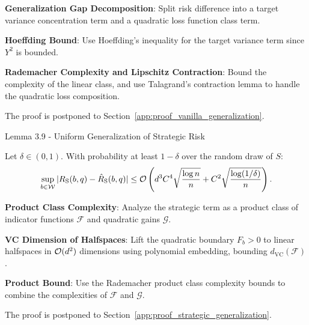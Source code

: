 \begin{guideblock}
\item \textbf{Generalization Gap Decomposition}: Split risk difference into a target variance concentration term and a quadratic loss function class term.
\item \textbf{Hoeffding Bound}: Use Hoeffding's inequality for the target variance term since $Y^2$ is bounded.
\item \textbf{Rademacher Complexity and Lipschitz Contraction}: Bound the complexity of the linear class, and use Talagrand's contraction lemma to handle the quadratic loss composition.
\end{guideblock}
The proof is postponed to Section~\ref{app:proof_vanilla_generalization}.

\begin{sourceblock}{Lemma 3.9 - Uniform Generalization of Strategic Risk}
\begin{lemma}
\label{lem:strategic_generalization}
Let $\delta \in (0, 1)$. With probability at least $1 - \delta$ over the random draw of $S$:
\begin{equation}
    \label{eq:strategic_gen_bound}
    \sup_{b \in \mathcal{W}} |R_{\mathrm{S}}(b, q) - \hat{R}_{\mathrm{S}}(b, q)| \le \mathcal{O}\left( d^3 C^4 \sqrt{\frac{\log n}{n}} + C^2 \sqrt{\frac{\log(1/\delta)}{n}} \right).
\end{equation}
\end{lemma}
\end{sourceblock}

\begin{guideblock}
\item \textbf{Product Class Complexity}: Analyze the strategic term as a product class of indicator functions $\mathcal{F}$ and quadratic gains $\mathcal{G}$.
\item \textbf{VC Dimension of Halfspaces}: Lift the quadratic boundary $F_b > 0$ to linear halfspaces in $\mathcal{O}(d^2)$ dimensions using polynomial embedding, bounding $d_{\mathrm{VC}}(\mathcal{F})$.
\item \textbf{Product Bound}: Use the Rademacher product class complexity bounds to combine the complexities of $\mathcal{F}$ and $\mathcal{G}$.
\end{guideblock}
The proof is postponed to Section~\ref{app:proof_strategic_generalization}.

